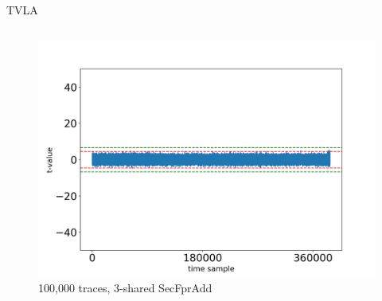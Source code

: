 \begin{frame}{TVLA}
\begin{columns}[T]
\begin{figure}
\includegraphics[width=\textwidth]{figure/tvla-F4-CHES/SecFprAdd_3shares_100k.png}
\vspace{-20pt}
\caption{100,000 traces, 3-shared SecFprAdd}
\end{figure}

\end{columns}


\end{frame}


%
%
%



